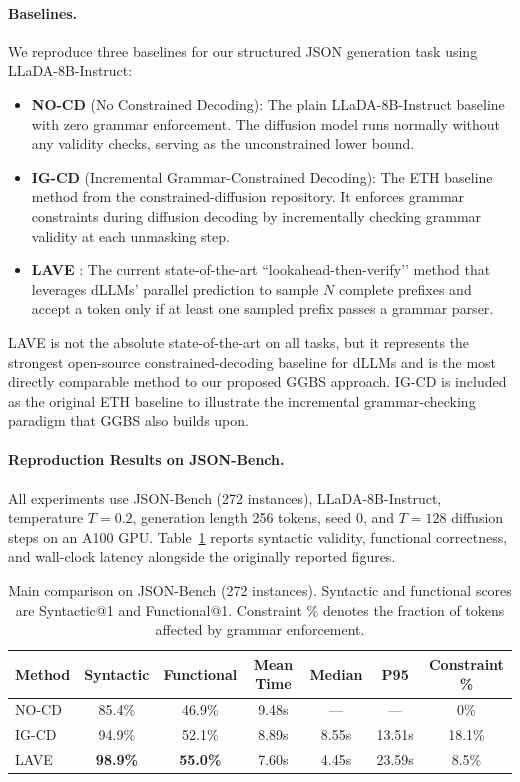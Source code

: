 \paragraph{Baselines.}
We reproduce three baselines for our structured JSON generation task using LLaDA-8B-Instruct:

\begin{itemize}
    \item \textbf{NO-CD} (No Constrained Decoding): The plain LLaDA-8B-Instruct baseline with zero grammar enforcement. The diffusion model runs normally without any validity checks, serving as the unconstrained lower bound.
    \item \textbf{IG-CD} (Incremental Grammar-Constrained Decoding): The ETH baseline method \citep{cd4dllm} from the constrained-diffusion repository. It enforces grammar constraints during diffusion decoding by incrementally checking grammar validity at each unmasking step.
    \item \textbf{LAVE} \citep{zhang2026lookaheadthenverifyreliableconstraineddecoding}: The current state-of-the-art ``lookahead-then-verify’’ method that leverages dLLMs’ parallel prediction to sample $N$ complete prefixes and accept a token only if at least one sampled prefix passes a grammar parser.
\end{itemize}

LAVE is not the absolute state-of-the-art on all tasks, but it represents the strongest open-source constrained-decoding baseline for dLLMs and is the most directly comparable method to our proposed GGBS approach. IG-CD is included as the original ETH baseline to illustrate the incremental grammar-checking paradigm that GGBS also builds upon.

\paragraph{Reproduction Results on JSON-Bench.}
All experiments use JSON-Bench (272 instances), LLaDA-8B-Instruct, temperature $T=0.2$, generation length 256 tokens, seed 0, and $T=128$ diffusion steps on an A100 GPU. Table~\ref{tab:main-comparison} reports syntactic validity, functional correctness, and wall-clock latency alongside the originally reported figures.

\begin{table}[h]
\centering
\caption{Main comparison on JSON-Bench (272 instances). Syntactic and functional scores are Syntactic@1 and Functional@1. Constraint \% denotes the fraction of tokens affected by grammar enforcement.}
\label{tab:main-comparison}
\begin{tabular}{lcccccc}
\hline
\textbf{Method} & \textbf{Syntactic} & \textbf{Functional} & \textbf{Mean Time} & \textbf{Median} & \textbf{P95} & \textbf{Constraint \%} \\
\hline
NO-CD   & 85.4\% & 46.9\% & 9.48s  & ---   & ---    & 0\%   \\
IG-CD   & 94.9\% & 52.1\% & 8.89s  & 8.55s & 13.51s & 18.1\% \\
LAVE    & \textbf{98.9\%} & \textbf{55.0\%} & 7.60s  & 4.45s & 23.59s & 8.5\%  \\
\hline
\end{tabular}
\end{table}

